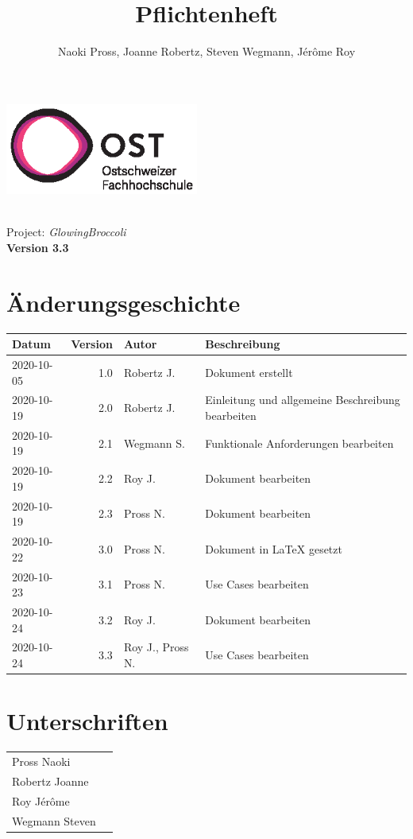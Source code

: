 \documentclass[a4paper, twosided, 11pt]{scrartcl}
\title{Pflichtenheft}
\author{Naoki Pross, Joanne Robertz, Steven Wegmann, J\'er\^ome Roy}
\begin{document}
\begin{titlepage}
  \includegraphics[height=3cm]{pic/ost-logo}
  \begin{flushright}
    \vspace{5cm}
    {\Huge \bfseries \thetitle} \\
    \vspace{5mm}
    {\LARGE Project: \textit{GlowingBroccoli}} \\
    \vspace{5mm}
    {\LARGE \bfseries Version 3.3}
  \end{flushright}
\end{titlepage}


\clearpage
\section*{\"Anderungsgeschichte}
\begin{tabularx}{\textwidth}{lrlX}
  \toprule
  \bfseries Datum & \bfseries Version & \bfseries Autor & \bfseries Beschreibung \\
  \midrule
  2020-10-05 & 1.0 & Robertz J. & Dokument erstellt \\
  2020-10-19 & 2.0 & Robertz J. & Einleitung und allgemeine Beschreibung bearbeiten \\
  2020-10-19 & 2.1 & Wegmann S. & Funktionale Anforderungen bearbeiten \\
  2020-10-19 & 2.2 & Roy J.     & Dokument bearbeiten \\
  2020-10-19 & 2.3 & Pross N.   & Dokument bearbeiten \\
  2020-10-22 & 3.0 & Pross N.   & Dokument in \textrm{\LaTeX} gesetzt \\
  2020-10-23 & 3.1 & Pross N.   & Use Cases bearbeiten \\
  2020-10-24 & 3.2 & Roy J.     & Dokument bearbeiten \\
  2020-10-24 & 3.3 & Roy J., Pross N.     & Use Cases bearbeiten \\
  \bottomrule
\end{tabularx}

\vfill
\section*{Unterschriften}
{
  \renewcommand{\arraystretch}{2}
  \begin{tabular}{lp{}}
    Pross Naoki    & \hrulefill \\
    Robertz Joanne & \hrulefill \\
    Roy J\'er\^ome & \hrulefill \\
    Wegmann Steven & \hrulefill \\
  \end{tabular}
}
\end{document}
